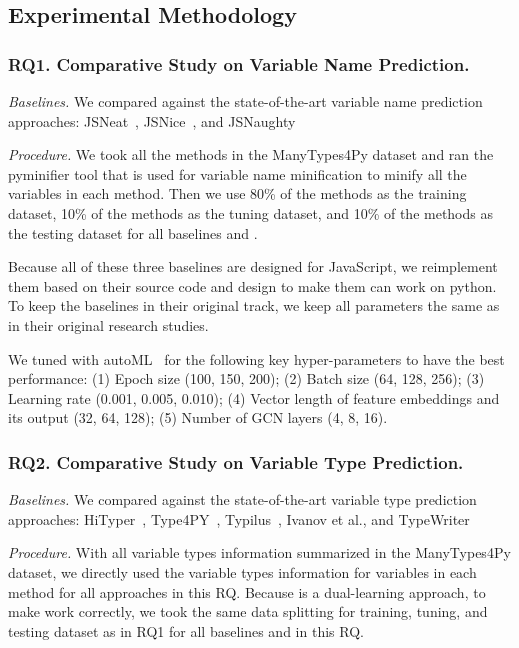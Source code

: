 

\subsection{Experimental Methodology}
\label{empirical-method}

\subsubsection{RQ1. Comparative Study on Variable Name Prediction.}

{\em Baselines.} We compared {\tool} against the state-of-the-art variable name prediction approaches: JSNeat~\cite{tran2019recovering}, JSNice~\cite{JSNice2015}, and JSNaughty~\cite{JSNaughty2017} 

\textit{Procedure.} We took all the methods in the ManyTypes4Py dataset and ran the pyminifier \cite{pyminifier} tool that is used for variable name minification to minify all the variables in each method. Then we use 80\% of the methods as the training dataset, 10\% of the methods as the tuning dataset, and 10\% of the methods as the testing dataset for all baselines and {\tool}.

Because all of these three baselines are designed for JavaScript, we reimplement them based on their source code and design to make them can work on python. To keep the baselines in their original track, we keep all parameters the same as in their original research studies.

We tuned {\tool} with autoML~\cite{NNI} for the following key hyper-parameters to have the best performance: (1) Epoch size (100, 150, 200); (2) Batch size (64, 128, 256); (3) Learning rate (0.001, 0.005, 0.010); (4) Vector length of feature embeddings and its
output (32, 64, 128); (5) Number of GCN layers (4, 8, 16). 

\subsubsection{RQ2. Comparative Study on Variable Type Prediction.}

{\em Baselines.} We compared {\tool} against the state-of-the-art variable type prediction approaches: HiTyper~\cite{type-graph-icse22}, Type4PY~\cite{mir2021type4py}, Typilus~\cite{allamanis2020typilus}, Ivanov et al.\cite{ivanov21predicting}, and TypeWriter~\cite{typewriter-fse20}

\textit{Procedure.} With all variable types information summarized in the ManyTypes4Py dataset, we directly used the variable types information for variables in each method for all approaches in this RQ. Because {\tool} is a dual-learning approach, to make {\tool} work correctly, we took the same data splitting for training, tuning, and testing dataset as in RQ1 for all baselines and {\tool} in this RQ.

